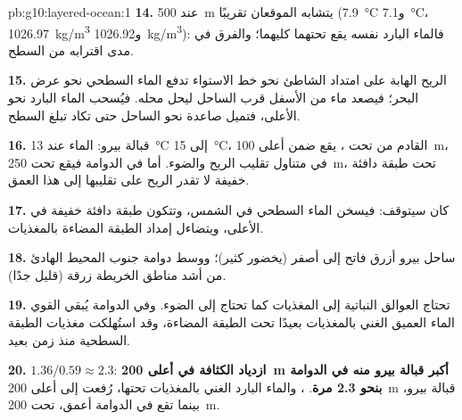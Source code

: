 \begin{solution}{pb:g10:layered-ocean:1}
\textbf{14.} عند \qty{500}{m} يتشابه الموقعان تقريبًا
(\qty{7.9}{\degreeCelsius} و\qty{7.1}{\degreeCelsius}،
\qty{1026.97}{kg/m^3} و\qty{1026.92}{kg/m^3}): فالماء البارد نفسه يقع
تحتهما كليهما؛ والفرق في مدى اقترابه من السطح.

\textbf{15.} الريح الهابة على امتداد الشاطئ نحو خط الاستواء تدفع الماء السطحي نحو
عرض البحر؛ فيصعد ماء من الأسفل قرب الساحل ليحل محله. فيُسحب الماء البارد  نحو الأعلى، فتميل  صاعدة نحو الساحل حتى تكاد
تبلغ السطح.

\textbf{16.} قبالة بيرو: الماء عند \qty{13}{\degreeCelsius} إلى
\qty{15}{\degreeCelsius}، القادم من تحت ، يقع ضمن أعلى
\qty{100}{m}، في متناول تقليب الريح والضوء. أما في
الدوامة فيقع تحت \qty{250}{m}، تحت طبقة دافئة خفيفة لا تقدر الريح على تقليبها إلى
هذا العمق.

\textbf{17.} كان  سيتوقف: فيسخن الماء السطحي في الشمس، وتتكون طبقة دافئة
خفيفة في الأعلى، ويتضاءل إمداد الطبقة المضاءة بالمغذيات.

\textbf{18.} ساحل بيرو أزرق فاتح إلى أصفر (يخضور كثير)؛ ووسط دوامة جنوب المحيط
الهادئ من أشد مناطق الخريطة زرقة (قليل جدًا).

\textbf{19.} تحتاج العوالق النباتية إلى المغذيات كما تحتاج إلى الضوء. وفي الدوامة
يُبقي  القوي الماء العميق الغني بالمغذيات بعيدًا تحت الطبقة
المضاءة، وقد استُهلكت مغذيات الطبقة السطحية منذ زمن بعيد.

\textbf{20.} $1.36/0.59 \approx 2.3$: \textbf{ازدياد الكثافة في أعلى
\qty{200}{m} أكبر قبالة بيرو منه في الدوامة بنحو 2.3 مرة}. ، والماء البارد الغني بالمغذيات تحتها، رُفعت إلى أعلى \qty{200}{m}
قبالة بيرو، بينما تقع في الدوامة أعمق، تحت
\qty{200}{m}.
\end{solution}
